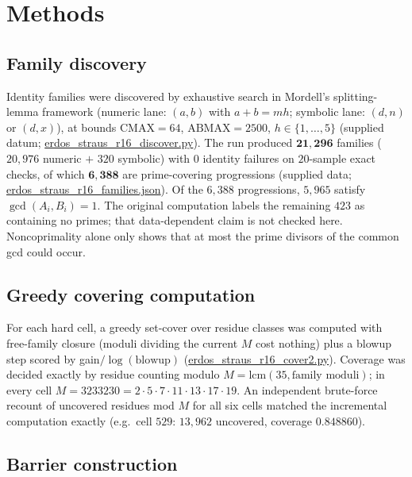 \documentclass[11pt,a4paper]{article}
\theoremstyle{definition}
\begin{document}
\section{Methods}
\label{sec:methods}

\subsection{Family discovery}

Identity families were discovered by exhaustive search in Mordell's
splitting-lemma framework (numeric lane: $(a,b)$ with $a+b=mh$; symbolic
lane: $(d,n)$ or $(d,x)$), at bounds $\mathrm{CMAX}=64$,
$\mathrm{ABMAX}=2500$, $h \in \{1,\dots,5\}$ (supplied datum;
\url{erdos_straus_r16_discover.py}). The run produced
$\mathbf{21{,}296}$ families ($20{,}976$ numeric $+$ $320$ symbolic) with
$0$ identity failures on $20$-sample exact checks, of which
$\mathbf{6{,}388}$ are prime-covering progressions (supplied data;
\url{erdos_straus_r16_families.json}). Of the $6{,}388$ progressions,
$5{,}965$ satisfy $\gcd(A_i,B_i)=1$. The original computation labels
the remaining $423$ as containing no primes; that data-dependent claim
is not checked here. Noncoprimality alone only shows that at most the
prime divisors of the common gcd could occur.

\subsection{Greedy covering computation}

For each hard cell, a greedy set-cover over residue classes was computed
with free-family closure (moduli dividing the current $M$ cost nothing)
plus a blowup step scored by gain$/\log(\text{blowup})$
(\url{erdos_straus_r16_cover2.py}). Coverage was decided exactly by
residue counting modulo $M = \mathrm{lcm}(35, \text{family moduli})$; in
every cell $M = 3233230 = 2\cdot 5\cdot 7\cdot 11\cdot 13\cdot 17\cdot 19$.
An independent brute-force recount of uncovered residues mod $M$ for all
six cells matched the incremental computation exactly (e.g.\ cell $529$:
$13{,}962$ uncovered, coverage $0.848860$).

\subsection{Barrier construction}
\end{document}

